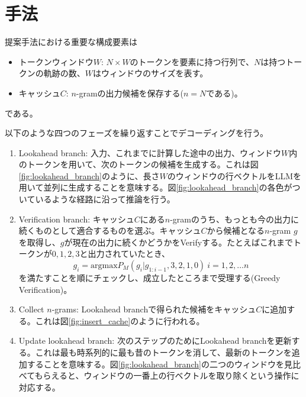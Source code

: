\documentclass[uplatex]{jsarticle}
\theoremstyle{remark}
\begin{document}
\section{手法}
提案手法における重要な構成要素は
\begin{itemize}
    \item トークンウィンドウ$W$: $N \times W$のトークンを要素に持つ行列で、$N$は持つトークンの軌跡の数、$W$はウィンドウのサイズを表す。
    \item キャッシュ$C$: $n$-gramの出力候補を保存する($n = N$である)。
\end{itemize}
である。

以下のような四つのフェーズを繰り返すことでデコーディングを行う。
\begin{enumerate}
    \item Lookahead branch: 入力、これまでに計算した途中の出力、ウィンドウ$W$内のトークンを用いて、次のトークンの候補を生成する。これは図\ref{fig:lookahead_branch}のように、長さ$W$のウィンドウの行ベクトルをLLMを用いて並列に生成することを意味する。図\ref{fig:lookahead_branch}の各色がついているような経路に沿って推論を行う。
    \item Verification branch: キャッシュ$C$にある$n$-gramのうち、もっとも今の出力に続くものとして適合するものを選ぶ。キャッシュ$C$から候補となる$n$-gram $g$を取得し、$g$が現在の出力に続くかどうかをVerifyする。たとえばこれまでトークンが$0, 1, 2, 3$と出力されていたとき、$$g_i = \mathrm{argmax}P_M(g_i | g_{1:i-1}, 3,2, 1, 0)\  i = 1, 2,\dots n$$ を満たすことを順にチェックし、成立したところまで受理する(Greedy Verification)。
    \item Collect $n$-grams: Lookahead branchで得られた候補をキャッシュ$C$に追加する。これは図\ref{fig:insert_cache}のように行われる。
    \item Update lookahead branch: 次のステップのためにLookahead branchを更新する。これは最も時系列的に最も昔のトークンを消して、最新のトークンを追加することを意味する。図\ref{fig:lookahead_branch}の二つのウィンドウを見比べてもらえると、ウィンドウの一番上の行ベクトルを取り除くという操作に対応する。
\end{enumerate}
\end{document}
